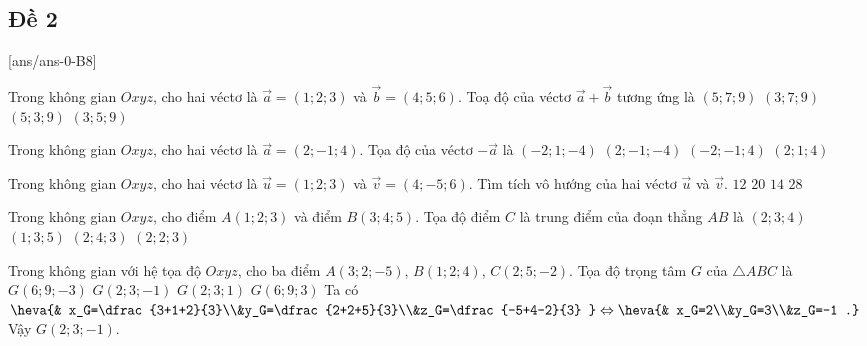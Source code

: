 \subsection{Đề 2}
\setcounter{ex}{0}
[ans/ans-0-B8]
\caulc
\begin{ex}%
	Trong không gian $Oxyz$, cho hai véctơ là $\vec{a}=(1;2;3)$ và $\vec{b}=(4;5;6)$. Toạ độ của véctơ $\vec{a}+\vec{b}$ tương ứng là
	\choice
	{\True $(5;7;9)$}
	{$(3;7;9)$}
	{$(5;3;9)$}
	{$(3;5;9)$}
\end{ex}	
\begin{ex}%
	Trong không gian $Oxyz$, cho hai véctơ là $\vec{a}=(2;-1;4)$. Tọa độ của  véctơ $-\vec{a}$ là
	\choice
	{\True $(-2;1;-4)$}
	{$(2;-1;-4)$}
	{$(-2;-1;4)$}
	{$(2;1;4)$}
\end{ex}	
\begin{ex}%
	Trong không gian $Oxyz$, cho hai véctơ là $\vec{u}=(1;2;3)$ và $\vec{v}=(4;-5;6)$. Tìm tích vô hướng của hai véctơ  $\vec{u}$ và $\vec{v}$.
	\choice
	{\True $12$}
	{$20$}
	{$14$}
	{$28$}
\end{ex}	
\begin{ex}%
	Trong không gian $Oxyz$, cho điểm $A(1;2;3)$ và điểm $B(3;4;5)$. Tọa độ điểm $C$ là trung điểm của đoạn thẳng $AB$ là
	\choice
	{\True $(2;3;4)$}
	{$(1; 3;5)$}
	{$(2;4;3)$}
	{$(2;2;3)$}
\end{ex}	
\begin{ex}%
	Trong không gian với hệ tọa độ $Oxyz$, cho ba điểm $A(3;2;-5)$, $B(1;2;4)$, $C(2;5;-2)$. Tọa độ trọng tâm $G$ của $\triangle ABC$ là
	\choice
	{$G(6;9;-3)$} 
	{\True $G(2;3;-1)$}
	{$G(2;3;1)$} 
	{$G(6;9;3)$}
	\loigiai
	{
		Ta có $\heva{& x_G=\dfrac{3+1+2}{3}\\&y_G=\dfrac{2+2+5}{3}\\&z_G=\dfrac{-5+4-2}{3} }\Leftrightarrow\heva{& x_G=2\\&y_G=3\\&z_G=-1 .}$\\
		Vậy $G(2;3;-1)$.
	}
\end{ex}


